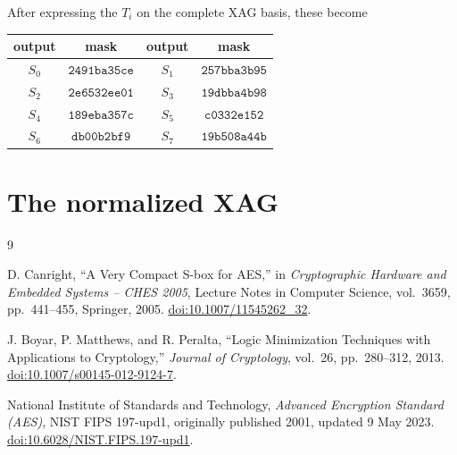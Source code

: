 \documentclass[11pt]{article}
\begin{document}
\begin{samepage}
After expressing the \(T_i\) on the complete XAG basis, these become
\begin{center}
\begin{tabular}{@{}cc@{\qquad}cc@{}}
\toprule
output&mask&output&mask\\
\midrule
\(S_0\)&\(\mathtt{2491ba35ce}\)&\(S_1\)&\(\mathtt{257bba3b95}\)\\
\(S_2\)&\(\mathtt{2e6532ee01}\)&\(S_3\)&\(\mathtt{19dbba4b98}\)\\
\(S_4\)&\(\mathtt{189eba357c}\)&\(S_5\)&\(\mathtt{c0332e152}\)\\
\(S_6\)&\(\mathtt{db00b2bf9}\)&\(S_7\)&\(\mathtt{19b508a44b}\)\\
\bottomrule
\end{tabular}
\end{center}
\end{samepage}

\section{The normalized XAG}



\begin{thebibliography}{9}

D. Canright,
``A Very Compact S-box for AES,''
in \emph{Cryptographic Hardware and Embedded Systems -- CHES 2005},
Lecture Notes in Computer Science, vol.~3659, pp.~441--455,
Springer, 2005.
\href{https://doi.org/10.1007/11545262_32}{doi:10.1007/11545262\_32}.

J. Boyar, P. Matthews, and R. Peralta,
``Logic Minimization Techniques with Applications to Cryptology,''
\emph{Journal of Cryptology}, vol.~26, pp.~280--312, 2013.
\href{https://doi.org/10.1007/s00145-012-9124-7}{doi:10.1007/s00145-012-9124-7}.

National Institute of Standards and Technology,
\emph{Advanced Encryption Standard (AES)},
NIST FIPS 197-upd1, originally published 2001, updated 9 May 2023.
\href{https://doi.org/10.6028/NIST.FIPS.197-upd1}{doi:10.6028/NIST.FIPS.197-upd1}.

\end{thebibliography}
\end{document}

